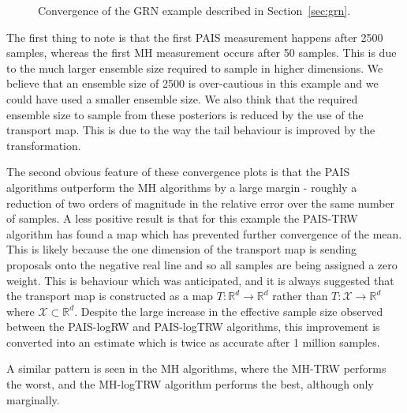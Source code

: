 \documentclass[final]{siamltex}
\begin{document}
\begin{figure}[!htb]
\centering
{}
\caption{Convergence of the GRN example described in Section~\ref{sec:grn}.}
\label{fig:grn_L2}
\end{figure}

The first thing to note is that the first PAIS measurement happens after 2500 samples, whereas the first MH measurement occurs after 50 samples. This is due to the much larger ensemble size required to sample in higher dimensions. We believe that an ensemble size of 2500 is over-cautious in this example and we could have used a smaller ensemble size. We also think that the required ensemble size to sample from these posteriors is reduced by the use of the transport map. This is due to the way the tail behaviour is improved by the transformation.

The second obvious feature of these convergence plots is that the PAIS algorithms outperform the MH algorithms by a large margin - roughly a reduction of two orders of magnitude in the relative error over the same number of samples. A less positive result is that for this example the PAIS-TRW algorithm has found a map which has prevented further convergence of the mean. This is likely because the one dimension of the transport map is sending proposals onto the negative real line and so all samples are being assigned a zero weight. This is behaviour which was anticipated, and it is always suggested that the transport map is constructed as a map $T\colon\mathbb{R}^d\rightarrow\mathbb{R}^d$ rather than $T\colon\mathcal{X}\rightarrow\mathbb{R}^d$ where $\mathcal{X}\subset\mathbb{R}^d$. Despite the large increase in the effective sample size observed between the PAIS-logRW and PAIS-logTRW algorithms, this improvement is  converted into an estimate which is twice as accurate after 1 million samples.

A similar pattern is seen in the MH algorithms, where the MH-TRW performs the worst, and the MH-logTRW algorithm performs the best, although only marginally.



\end{document}
